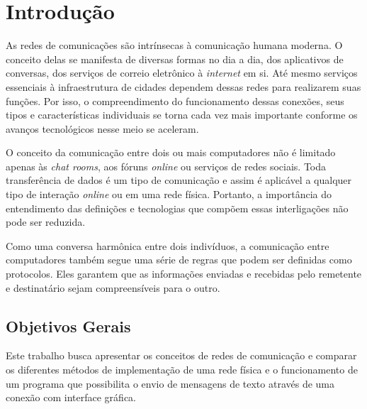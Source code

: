 





\textual
\newpage\thispagestyle{empty}


\chapter{\textbf{Introdução}}

\par As redes de comunicações são intrínsecas à comunicação humana moderna. O conceito delas se manifesta de diversas formas no dia a dia, dos aplicativos de conversas, dos serviços de correio eletrônico à \textit{internet} em si. Até mesmo serviços essenciais à infraestrutura de cidades dependem dessas redes para realizarem suas funções. Por isso, o compreendimento do funcionamento dessas conexões, seus tipos e características individuais se torna cada vez mais importante conforme os avanços tecnológicos nesse meio se aceleram.

\par O conceito da comunicação entre dois ou mais computadores não é limitado apenas às \textit{chat rooms}, aos fóruns \textit{online} ou serviços de redes sociais. Toda transferência de dados é um tipo de comunicação e assim é aplicável a qualquer tipo de interação \textit{online} ou em uma rede física. Portanto, a importância do entendimento das definições e tecnologias que compõem essas interligações não pode ser reduzida.

\par Como uma conversa harmônica entre dois indivíduos, a comunicação entre computadores também segue uma série de regras que podem ser definidas como protocolos. Eles garantem que as informações enviadas e recebidas pelo remetente e destinatário sejam compreensíveis para o outro.
\newpage\thispagestyle{empty}
\section{\textbf{Objetivos Gerais}}
\par Este trabalho busca apresentar os conceitos de redes de comunicação e comparar os diferentes métodos de implementação de uma rede física e o funcionamento de um programa que possibilita o envio de mensagens de texto através de uma conexão com interface gráfica.

